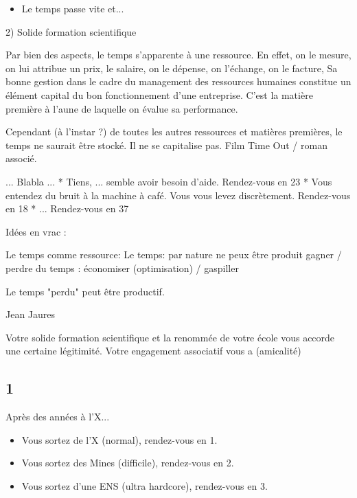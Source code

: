 \documentclass[12pt,a4paper,titlepage]{article}
\begin{document}
\begin{multicols}{2}
\begin{itemize}
\item Le temps passe vite et...
\end{itemize}




2) Solide formation scientifique


Par bien des aspects, le temps s'apparente à une ressource.
En effet, on le mesure, on lui attribue un prix, le salaire, on le dépense, on l'échange, on le facture,
Sa bonne gestion dans le cadre du management des ressources humaines constitue un élément capital du bon fonctionnement d'une entreprise. C'est la matière première à l'aune de laquelle on évalue sa performance.

Cependant (à l'instar ?) de toutes les autres ressources et matières premières, le temps ne saurait être stocké.
Il ne se capitalise pas.
Film Time Out / roman associé.










... Blabla ...
* Tiens, ... semble avoir besoin d'aide. Rendez-vous en 23
* Vous entendez du bruit à la machine à café. Vous vous levez discrètement. Rendez-vous en 18
* ... Rendez-vous en 37


Idées en vrac :

Le temps comme ressource:
Le temps: par nature ne peux être produit
gagner / perdre du temps : économiser (optimisation) / gaspiller

Le temps "perdu" peut être productif.

Jean Jaures

Votre solide formation scientifique et la renommée de votre école vous accorde une certaine légitimité. Votre engagement associatif vous a  (amicalité)




\label{n1}
\subsection*{1}
Après des années à l'X... \\
\begin{itemize}
\item Vous sortez de l'X (normal), rendez-vous en 1.
\item Vous sortez des Mines (difficile), rendez-vous en 2.
\item Vous sortez d'une ENS (ultra hardcore), rendez-vous en 3.
\end{itemize}



\end{multicols}
\end{document}
